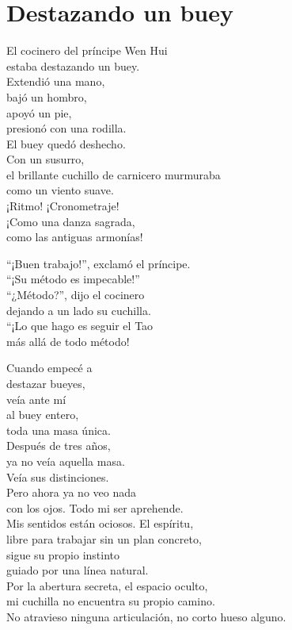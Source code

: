 \documentclass[hidelinks]{memoir}
\begin{document}
	\chapter*{Destazando un buey}
	
	El cocinero del príncipe Wen Hui\\
	estaba destazando un buey.\\
	Extendió una mano,\\
	bajó un hombro,\\
	apoyó un pie,\\
	presionó con una rodilla.\\
	El buey quedó deshecho.\\
	Con un susurro,\\
	el brillante cuchillo de carnicero murmuraba\\
	como un viento suave.\\
	¡Ritmo! ¡Cronometraje!\\
	¡Como una danza sagrada,\\
	como las antiguas armonías!
	
	``¡Buen trabajo!'', exclamó el príncipe.\\
	``¡Su método es impecable!''\\
	``¿Método?'', dijo el cocinero\\
	dejando a un lado su cuchilla.\\
	``¡Lo que hago es seguir el Tao\\
	más allá de todo método!
	
	Cuando empecé a\\
	destazar bueyes,\\
	veía ante mí\\
	al buey entero,\\
	toda una masa única.\\
	Después de tres años,\\
	ya no veía aquella masa.\\
	Veía sus distinciones.\\
	Pero ahora ya no veo nada\\
	con los ojos. Todo mi ser aprehende.\\
	Mis sentidos están ociosos. El espíritu,\\
	libre para trabajar sin un plan concreto,\\
	sigue su propio instinto\\
	guiado por una línea natural.\\
	Por la abertura secreta, el espacio oculto,\\
	mi cuchilla no encuentra su propio camino.\\
	No atravieso ninguna articulación, no corto hueso alguno.
	
\end{document}
